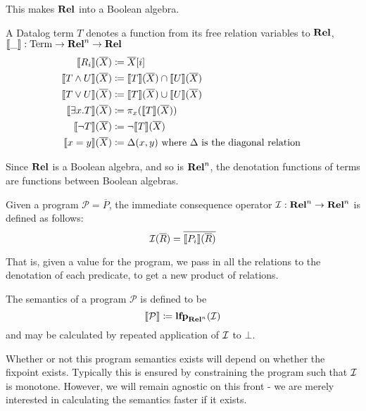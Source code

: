 This makes $\mathbf{Rel}$ into a Boolean algebra.

\begin{defn}
  A Datalog term $T$ denotes a function from its free relation variables to
  $\mathbf{Rel}$, $\llbracket \_ \rrbracket : \mathrm{Term} \rightarrow \mathbf{Rel}^n \rightarrow \mathbf{Rel}$
  \begin{align*}
    \llbracket R_i \rrbracket(\overline{X}) &\coloneqq \overline{X}[i] \\
    \llbracket T \wedge U \rrbracket(\overline{X}) &\coloneqq \llbracket T \rrbracket(\overline{X}) \cap  \llbracket U \rrbracket(\overline{X})\\
    \llbracket T \vee U \rrbracket(\overline{X}) &\coloneqq \llbracket T \rrbracket(\overline{X}) \cup  \llbracket U \rrbracket(\overline{X})\\
    \llbracket \exists x. T \rrbracket(\overline{X}) &\coloneqq \pi_x(\llbracket T \rrbracket(\overline{X}))\\
    \llbracket \neg T \rrbracket(\overline{X}) &\coloneqq \neg \llbracket T \rrbracket(\overline{X})\\
    \llbracket x=y \rrbracket(\overline{X}) &\coloneqq \Delta(x, y) \text{ where } \Delta \text{ is the diagonal relation }
  \end{align*}
\end{defn}

Since $\mathbf{Rel}$ is a Boolean algebra, and so is $\mathbf{Rel}^n$, the denotation
functions of terms are functions between Boolean algebras.

\begin{defn}
  Given a program $\mathcal{P} = \overline{P}$, the immediate consequence operator $\mathcal{I}: \mathbf{Rel}^n \rightarrow \mathbf{Rel}^n$ is defined as follows:
  $$\mathcal{I}(\overline{R}) = \overline{\llbracket P_i \rrbracket(\overline{R})}$$
\end{defn}

That is, given a value for the program, we pass in all the relations
to the denotation of each predicate, to get a new product of relations.

\begin{defn}
  The semantics of a program $\mathcal{P}$ is defined to be 
  $$\llbracket \mathcal{P} \rrbracket \coloneqq \textbf{lfp}_{\mathbf{Rel}^n}(\mathcal{I})$$
  and may be calculated by repeated application of $\mathcal{I}$ to $\bot$.
\end{defn}

Whether or not this program semantics exists will depend on whether the fixpoint
exists. Typically this is ensured by constraining the program such that $\mathcal{I}$
is monotone. However, we will remain agnostic on this front - we are merely
interested in calculating the semantics faster if it exists.


